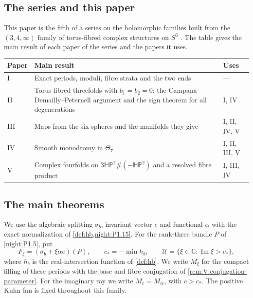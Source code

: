 \subsection{The series and this paper}
This paper is the fifth of a series on the holomorphic families built
from the $(3,4,\infty)$ family of torus-fibred complex structures on
$S^6$ \citep{AC26,E26}.  The table gives the main result of each paper
of the series and the papers it uses.
\begin{center}\small
\begin{tabularx}{\textwidth}{@{}lXl@{}}\toprule
Paper & Main result & Uses\\\midrule
I & Exact periods, moduli, fibre strata and the two ends & ---\\
II & Torus-fibred threefolds with $b_1=b_2=0$: the Campana--Demailly--Peternell argument and the sign theorem for all degenerations & I, IV\\
III & Maps from the six-spheres and the manifolds they give & I, II, IV, V\\
IV & Smooth monodromy in $\Theta_7$ & I, II, III, V\\
V & Complex fourfolds on $3\mathbb{HP}^2\#(-\mathbb{HP}^2)$ and a resolved fibre product & I, III, IV\\
\bottomrule\end{tabularx}\end{center}
\subsection{The main theorems}
\hypertarget{tag-03KQ}{}\label{series:V:main-theorems}

\begin{definition}
\hypertarget{tag-PV14}{}\label{pub:V:parameter}
We use the algebraic splitting $\sigma_b$, invariant vector $e$ and
functional $\alpha$ with the exact normalization of
\cref{def:hb,night:P1.15}. For the rank-three bundle $P$ of
\cref{night:P1.5}, put
\[
 F_\xi=(\sigma_b+\xi\alpha e)(P),\qquad
 c_*=-\min h_b,\qquad
 \mathcal U=\{\xi\in\mathbb C:\operatorname{Im}\xi>c_*\},
\]
where $h_b$ is the real-intersection function of \cref{def:hb}.
We write $M_\xi$ for the compact filling of these periods with the
base and fibre conjugation of \cref{rem:V:conjugation-parameter}.
For the imaginary ray we write $M_c=M_{ic}$, with $c>c_*$.
The positive Kuhn fan is fixed throughout this family.
\end{definition}

